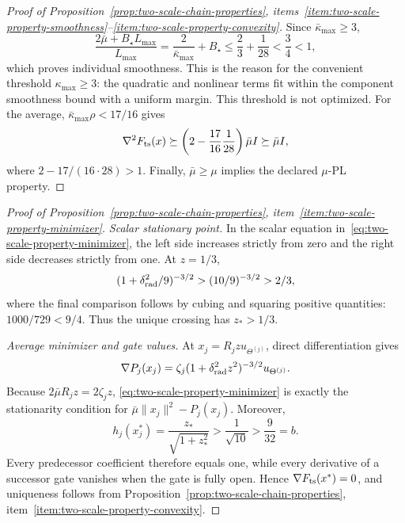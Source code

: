\documentclass{article}
\theoremstyle{definition}
\begin{document}
\begin{proof}[Proof of Proposition~\ref{prop:two-scale-chain-properties},
items~\ref{item:two-scale-property-smoothness}--\ref{item:two-scale-property-convexity}]
Since $\bar\kappa_{\max}\ge3$,
\begin{equation}
 \frac{2\bar\mu+B_\star L_{\max}}{L_{\max}}
 =\frac2{\bar\kappa_{\max}}+B_\star
 \le\frac23+\frac1{28}<\frac34<1,
\end{equation}
which proves individual smoothness.  This is the reason for the convenient
threshold $\kappa_{\max}\ge3$: the quadratic and nonlinear terms fit within
the component smoothness bound with a uniform margin.  This threshold is not
optimized.  For the average,
$\bar\kappa_{\max}\rho<17/16$ gives
\begin{equation}
 \nabla^2F_{\rm ts}(x)
 \succeq
 \left(2-\frac{17}{16}\frac1{28}\right)\bar\mu I
 \succeq\bar\mu I,
\end{equation}
where $2-17/(16\cdot28)>1$.
Finally, $\bar\mu\ge\mu$ implies the declared $\mu$-PL property.
\end{proof}

\begin{proof}[Proof of Proposition~\ref{prop:two-scale-chain-properties},
item~\ref{item:two-scale-property-minimizer}]
\emph{Scalar stationary point.}
In the scalar equation in~\eqref{eq:two-scale-property-minimizer}, the left
side increases strictly
from zero and the right side decreases strictly from one.  At $z=1/3$,
\begin{equation}
 (1+\delta_{\rm rad}^2/9)^{-3/2}>(10/9)^{-3/2}>2/3,
\end{equation}
where the final comparison follows by cubing and squaring positive
quantities: $1000/729<9/4$.  Thus the unique crossing has $z_*>1/3$.

\emph{Average minimizer and gate values.}
At $x_j=R_jzu_{\Theta^{(j)}}$, direct differentiation gives
\begin{equation}
 \nabla P_j(x_j)
 =\zeta_j(1+\delta_{\rm rad}^2z^2)^{-3/2}u_{\Theta^{(j)}}.
\end{equation}
Because $2\bar\mu R_jz=2\zeta_jz$,
\eqref{eq:two-scale-property-minimizer} is exactly the stationarity
condition for $\bar\mu\|x_j\|^2-P_j(x_j)$.  Moreover,
\begin{equation}
 h_j(x_j^*)=\frac{z_*}{\sqrt{1+z_*^2}}
 >\frac1{\sqrt{10}}>\frac9{32}=b.
\end{equation}
Every predecessor coefficient therefore equals one, while every derivative
of a successor gate vanishes when the gate is fully open.  Hence
$\nabla F_{\rm ts}(x^*)=0$, and uniqueness follows from
Proposition~\ref{prop:two-scale-chain-properties},
item~\ref{item:two-scale-property-convexity}.
\end{proof}
\end{document}
